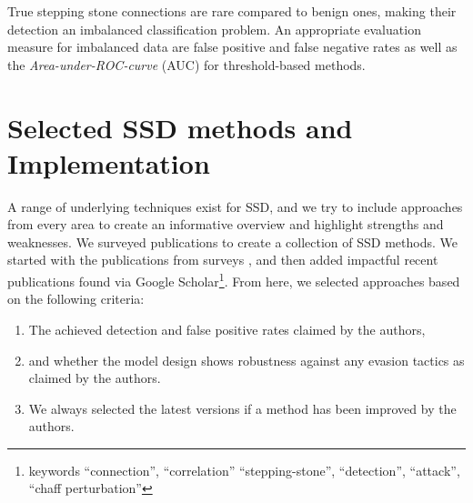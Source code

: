 \documentclass[runningheads,11pt]{llncs}\usepackage[]{graphicx}\usepackage[]{color}
\begin{document}

True stepping stone connections are rare compared to benign ones, making their detection an imbalanced classification problem. An appropriate evaluation measure for imbalanced data are false positive and false negative rates as well as the \textit{Area-under-ROC-curve} (AUC) for threshold-based methods.


\section{Selected SSD methods and Implementation}\label{Sec:Selection}

A range of underlying techniques exist for SSD, and we try to include approaches from every area to create an informative overview and highlight strengths and weaknesses. 
We surveyed publications to create a collection of SSD methods. We started with the publications from surveys \cite{shullich2011survey,wang2018research}, and then added impactful recent publications found via Google Scholar\footnote{keywords ``connection'', ``correlation'' ``stepping-stone'', ``detection'', ``attack'', ``chaff perturbation''}.
From here, we selected approaches based on the following criteria:


\begin{enumerate}
\item The achieved detection and false positive rates claimed by the authors,
\item and whether the model design shows robustness against any evasion tactics as claimed by the authors.
\item We always selected the latest versions if a method has been improved by the authors.
\end{enumerate}
\end{document}
